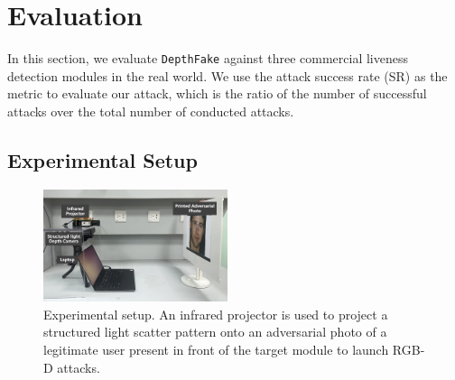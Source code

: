 \section{Evaluation}
\label{sec:evaluation}
In this section, we evaluate \texttt{DepthFake} against three commercial liveness detection modules in the real world. 
We use the attack success rate (SR) as the metric to evaluate our attack, which is the ratio of the number of successful attacks  over the total number of conducted attacks. 


\subsection{Experimental Setup}
\label{sec:experimental}

\begin{figure}[pt]
	\centerline{\includegraphics[width = 0.48\textwidth]{figures/setup.png}}
	\caption{Experimental setup. An infrared projector is used to project a structured light scatter pattern onto an adversarial photo of a legitimate user present in front of the target module to launch RGB-D attacks.}
	\vspace{-0.1in}
	\label{setup}
\end{figure}


\begin{table}[pt]
	\small 
	\caption{Default parameters during evaluation}
	\vspace{-0.2in}
	\begin{center}
		\label{default_param}
	\end{center}
	\vspace{-0.15in}
\end{table}

